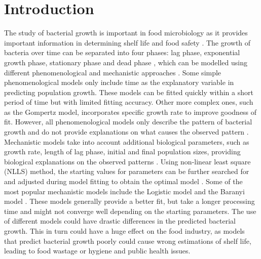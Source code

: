 \documentclass[11pt]{article}
\begin{document}
\section{Introduction}
The study of bacterial growth is important in food microbiology as it provides important information in determining shelf life and food safety \cite{zwietering_modeling_1990}. The growth of bacteria over time can be separated into four phases: lag phase, exponential growth phase, stationary phase and dead phase \cite{wang_bacterial_2015}, which can be modelled using different phenomenological and mechanistic approaches \cite{johnson_model_2004, peleg_microbial_2011}. Some simple phenomenological models only include time as the explanatory variable in predicting population growth. These models can be fitted quickly within a short period of time but with limited fitting accuracy. Other more complex ones, such as the Gompertz model, incorporates specific growth rate to improve goodness of fit. However, all phenomenological models only describe the pattern of bacterial growth and do not provide explanations on what causes the observed pattern \cite{peleg_microbial_2011}. Mechanistic models take into account additional biological parameters, such as growth rate, length of lag phase, initial and final population sizes, providing biological explanations on the observed patterns \cite{zwietering_modeling_1990}. Using non-linear least square (NLLS) method, the starting values for parameters can be further searched for and adjusted during model fitting to obtain the optimal model \cite{see_parameter_2018}. Some of the most popular mechanistic models include the Logistic model \cite{zwietering_modeling_1990} and the Baranyi model \cite{baranyi_dynamic_1994}. These models generally provide a better fit, but take a longer processing time and might not converge well depending on the starting parameters. The use of different models could have drastic differences in the predicted bacterial growth. This in turn could have a huge effect on the food industry, as models that predict bacterial growth poorly could cause wrong estimations of shelf life, leading to food wastage or hygiene and public health issues. 
\vspace{\baselineskip}
\end{document}
